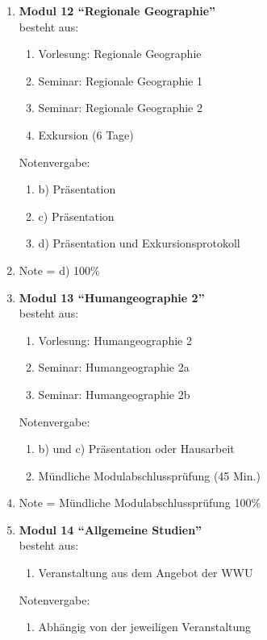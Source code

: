\begin{enumerate}
 \item \textbf{Modul 12 ``Regionale Geographie''}  \\ besteht aus:
  \begin{enumerate}
   \item Vorlesung: Regionale Geographie
   \item Seminar: Regionale Geographie 1
   \item Seminar: Regionale Geographie 2
   \item Exkursion (6 Tage)
  \end{enumerate}
  Notenvergabe:
  \begin{enumerate}
   \item[] b) Präsentation
   \item[] c) Präsentation
   \item[] d) Präsentation und Exkursionsprotokoll
  \end{enumerate}
  \item[]  Note = d) 100\% 

 \item \textbf{Modul 13 ``Humangeographie 2''}  \\ besteht aus:
  \begin{enumerate}
   \item Vorlesung: Humangeographie 2
   \item Seminar: Humangeographie 2a
   \item Seminar: Humangeographie 2b
  \end{enumerate}
  Notenvergabe:
  \begin{enumerate}
   \item[] b) und c) Präsentation oder Hausarbeit
   \item[] Mündliche Modulabschlussprüfung (45 Min.)
  \end{enumerate}
  \item[] Note = Mündliche Modulabschlussprüfung 100\%

 \item \textbf{Modul 14 ``Allgemeine Studien''}  \\ besteht aus:
  \begin{enumerate}
   \item Veranstaltung aus dem Angebot der WWU
  \end{enumerate}
  Notenvergabe:
  \begin{enumerate}
   \item Abhängig von der jeweiligen Veranstaltung
  \end{enumerate}


\end{enumerate}
